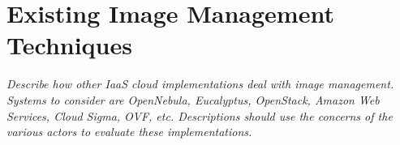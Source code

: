 \section{Existing Image Management Techniques}
\label{sec:other-approaches}

{\em Describe how other IaaS cloud implementations deal with image
  management.  Systems to consider are OpenNebula, Eucalyptus,
  OpenStack, Amazon Web Services, Cloud Sigma, OVF, etc.  Descriptions
  should use the concerns of the various actors to evaluate these
  implementations.}
